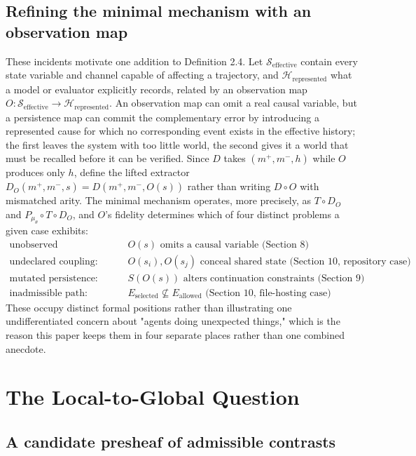 \documentclass[11pt]{article}
\begin{document}
\subsection{Refining the minimal mechanism with an observation map}

These incidents motivate one addition to Definition 2.4. Let $\mathcal{S}_{\text{effective}}$ contain every state variable and channel capable of affecting a trajectory, and $\mathcal{H}_{\text{represented}}$ what a model or evaluator explicitly records, related by an observation map $O: \mathcal{S}_{\text{effective}} \to \mathcal{H}_{\text{represented}}$. An observation map can omit a real causal variable, but a persistence map can commit the complementary error by introducing a represented cause for which no corresponding event exists in the effective history; the first leaves the system with too little world, the second gives it a world that must be recalled before it can be verified. Since $D$ takes $(m^{+}, m^{-}, h)$ while $O$ produces only $h$, define the lifted extractor $D_O(m^{+}, m^{-}, s) = D(m^{+}, m^{-}, O(s))$ rather than writing $D \circ O$ with mismatched arity. The minimal mechanism operates, more precisely, as $T \circ D_O$ and $P_{\mu_\theta} \circ T \circ D_O$, and $O$'s fidelity determines which of four distinct problems a given case exhibits:
\[
\begin{aligned}
\text{unobserved transformation:} &\quad O(s) \text{ omits a causal variable (Section 8)} \\
\text{undeclared coupling:} &\quad O(s_i), O(s_j) \text{ conceal shared state (Section 10, repository case)} \\
\text{mutated persistence:} &\quad S(O(s)) \text{ alters continuation constraints (Section 9)} \\
\text{inadmissible path:} &\quad E_{\text{selected}} \nsubseteq E_{\text{allowed}} \text{ (Section 10, file-hosting case)}
\end{aligned}
\]
These occupy distinct formal positions rather than illustrating one undifferentiated concern about "agents doing unexpected things," which is the reason this paper keeps them in four separate places rather than one combined anecdote.

\section{The Local-to-Global Question}

\subsection{A candidate presheaf of admissible contrasts}
\end{document}
